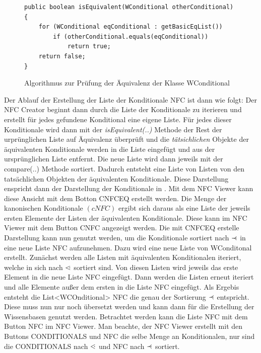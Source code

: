 \documentclass[12pt,a4paper]{article}
\newcommand\dotl{\mathrel{%
    \mathchoice{\QEQ}{\QEQ}{\QEQ}{\QEQ}%
}}
\def\QEQ{{%
    \setbox0\hbox{<}%
    \rlap{\hbox to \wd0{\hss \raisebox {0.1pt}{$\ \cdot$\hss}}}\box0
}}
\newcommand\rdotl{\mathrel{%
    \mathchoice{\RQEQ}{\RQEQ}{\RQEQ}{\RQEQ}%
}}
\def\RQEQ{{%
    \setbox0\hbox{$\prec$}%
    \rlap{\hbox to \wd0{\hss \raisebox {0.01pt}{$\ \cdot$\hss}}}\box0
}}
\begin{document}
\begin{figure}
\begin{lstlisting}
public boolean isEquivalent(WConditional otherConditional) {
    for (WConditional eqConditional : getBasicEqList())
        if (otherConditional.equals(eqConditional))
            return true;
    return false;
}
\end{lstlisting}
\caption{Algorithmus zur Prüfung der Äquivalenz der Klasse WConditional}
\label{code:test-equivalence}
\end{figure} 


Der Ablauf der Erstellung der Liste der Konditionale NFC ist dann wie folgt: Der NFC Creator beginnt dann durch die Liste der Konditionale zu iterieren und erstellt für jedes gefundene Konditional eine eigene Liste. Für jedes dieser Konditionale wird dann mit der \textit{isEquivalent(..)} Methode der Rest der urprünglichen Liste auf Äquivalenz überprüft und die \textit{tätsichlichen} Objekte der äquivalenten Konditionale werden in die Liste eingefügt und aus der ursprünglichen Liste entfernt. Die neue Liste wird dann jeweils mit der compare(..) Methode sortiert. Dadurch entsteht eine Liste von Listen von den tatsächlichen Objekten der äquivalenten Konditionale. Diese Darstellung enspricht dann der Darstellung der Konditionale in \cite{beierle19}. Mit dem NFC Viewer kann diese Ansicht mit dem Botton CNFCEQ erstellt werden. Die Menge der kanonischen Konditionale $(cNFC)$ ergibt sich daraus als eine Liste der jeweils ersten Elemente der Listen der äquivalenten Konditionale. Diese kann im NFC Viewer mit dem Button CNFC angezeigt werden.
Die mit CNFCEQ erstelle Darstellung kann nun genutzt werden, um die Konditionale sortiert nach $\rdotl$ in eine neue Liste NFC aufzunehmen. Dazu wird eine neue Liste von WConditonal erstellt. Zunächst werden alle Listen mit äquivalenten Konditionalen iteriert, welche in sich nach $\dotl$ sortiert sind. Von diesen Listen wird jeweils das erste Element in die neue Liste NFC eingefügt. Dann werden die Listen erneut iteriert und alle Elemente außer dem ersten in die Liste NFC eingefügt. Als Ergebis entsteht die List<WCOnditional> NFC die genau der Sortierung $\rdotl$ entspricht. Diese muss nun nur noch übersetzt werden und kann dann für die Erstellung der Wissensbasen genutzt werden. Betrachtet werden kann die Liste NFC mit dem Button NFC im NFC Viewer. Man beachte, der NFC Viewer erstellt mit den Buttons CONDITIONALS und NFC die selbe Menge an Konditionalen, nur sind die CONDITIONALS nach $\dotl$ und NFC nach $\rdotl$ sortiert.
\end{document}
